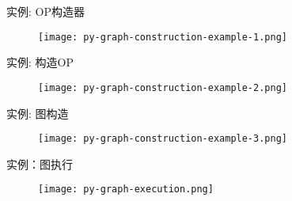 \begin{frame}{实例: OP构造器}
  \begin{figure}
    \centering
    \texttt{[image: py-graph-construction-example-1.png]}
  \end{figure}
\end{frame}

\begin{frame}{实例: 构造OP}
  \begin{figure}
    \centering
    \texttt{[image: py-graph-construction-example-2.png]}
  \end{figure}
\end{frame}

\begin{frame}{实例: 图构造}
  \begin{figure}
    \centering
    \texttt{[image: py-graph-construction-example-3.png]}
  \end{figure}
\end{frame}

\begin{frame}{实例：图执行}
  \begin{figure}
    \centering
    \texttt{[image: py-graph-execution.png]}
  \end{figure}
\end{frame}

